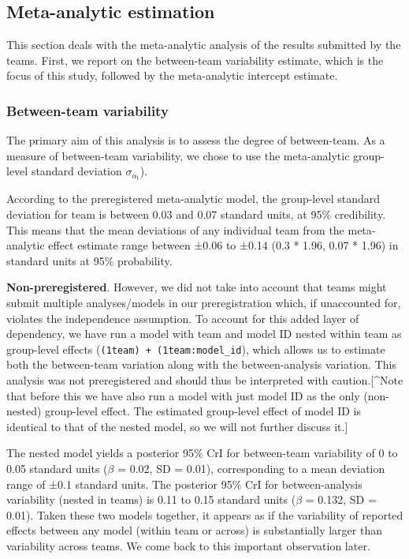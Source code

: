 \documentclass[Review,times,sageh]{sagej}
\begin{document}
\hypertarget{meta-analytic-estimation}{%
\subsection{Meta-analytic estimation}\label{meta-analytic-estimation}}

This section deals with the meta-analytic analysis of the results submitted by the teams.
First, we report on the between-team variability estimate, which is the focus of this study, followed by the meta-analytic intercept estimate.

\hypertarget{between-team-variability}{%
\subsubsection{Between-team variability}\label{between-team-variability}}

The primary aim of this analysis is to assess the degree of between-team.
As a measure of between-team variability, we chose to use the meta-analytic group-level standard deviation \(\sigma_{\alpha_{\text{t}}}\)).

According to the preregistered meta-analytic model, the group-level standard deviation for team is between 0.03 and 0.07 standard units, at 95\% credibility.
This means that the mean deviations of any individual team from the meta-analytic effect estimate range between ±0.06 to ±0.14 (0.3 * 1.96, 0.07 * 1.96) in standard units at 95\% probability.

\textbf{Non-preregistered}. However, we did not take into account that teams might submit multiple analyses/models in our preregistration which, if unaccounted for, violates the independence assumption.
To account for this added layer of dependency, we have run a model with team and model ID nested within team as group-level effects (\texttt{(1\textbar{}team)\ +\ (1\textbar{}team:model\_id}), which allows us to estimate both the between-team variation along with the between-analysis variation.
This analysis was not preregistered and should thus be interpreted with caution.{[}\^{}Note that before this we have also run a model with just model ID as the only (non-nested) group-level effect. The estimated group-level effect of model ID is identical to that of the nested model, so we will not further discuss it.{]}

The nested model yields a posterior 95\% CrI for between-team variability of 0 to 0.05 standard units (\(\beta\) = 0.02, SD = 0.01), corresponding to a mean deviation range of ±0.1 standard units.
The posterior 95\% CrI for between-analysis variability (nested in teams) is 0.11 to 0.15 standard units (\(\beta\) = 0.132, SD = 0.01).
Taken these two models together, it appears as if the variability of reported effects between any model (within team or across) is substantially larger than variability across teams.
We come back to this important observation later.
\end{document}
